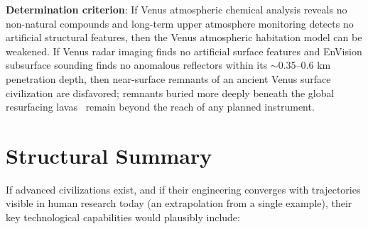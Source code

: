 \documentclass[aps,prd,twocolumn,superscriptaddress,nofootinbib]{revtex4-2}
\begin{document}
\textbf{Determination criterion}: If Venus atmospheric chemical analysis reveals no non-natural compounds and long-term upper atmosphere monitoring detects no artificial structural features, then the Venus atmospheric habitation model can be weakened. If Venus radar imaging finds no artificial surface features and EnVision subsurface sounding finds no anomalous reflectors within its ${\sim}$0.35--0.6 km penetration depth, then near-surface remnants of an ancient Venus surface civilization are disfavored; remnants buried more deeply beneath the global resurfacing lavas~\cite{Strom1994} remain beyond the reach of any planned instrument.


\section{Structural Summary}\label{sec:summary}

If advanced civilizations exist, and if their engineering converges with trajectories visible in human research today (an extrapolation from a single example), their key technological capabilities would plausibly include:
\end{document}
